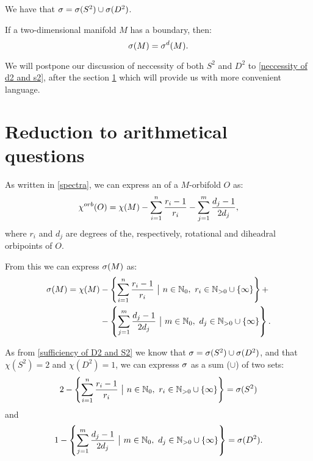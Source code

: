 
\begin{corollary}
We have that ${\sigma} = {{\sigma}(S^2)} \cup {{\sigma}(D^2)}$.
\end{corollary}

\begin{observation}\label{only dihedral} 
If a two-dimensional manifold $M$ has a boundary, then:
\begin{equation}
{{\sigma}(M)} = {\sigma}^{d}(M).
\end{equation}
\end{observation}

We will postpone our discussion of neccessity of both $S^2$ and $D^2$ to 
\ref{neccessity of d2 and s2}, after 
the 
section \ref{Reduction to arithmetical questions section} which will provide us 
with more convenient language. 

\section{Reduction to arithmetical questions}\label{Reduction to arithmetical questions section}
As written in \ref{spectra}, we can express an \Eoc of a $M$-orbifold $O$ as:
\begin{equation}
{\chi^{orb}(O)} = \chi (M) - \sum_{i=1}^n \frac{r_i-1}{r_i} - \sum_{j=1}^m \frac{d_j-1}{2d_j},
\end{equation}
where $r_i$ and $d_j$ are degrees of the, respectively, rotational and diheadral orbipoints 
of $O$.

From this we can express ${{\sigma}(M)}$ as:
\begin{align}
\spe(M) = \chi (M) &-\left\{\sum\limits_{i=1}^n \frac{r_i-1}{r_i}\ \big|\ n\in\mathbb{N}_0,\ 
r_i\in\mathbb{N}_{>0}\cup \{\infty\}\right\}+ \\
&- \left\{\sum\limits_{j=1}^m\frac{d_j-1}{2d_j}\ 
\big|\ m\in\mathbb{N}_0,\ d_j\in\mathbb{N}_{>0}\cup \{\infty\}\right\} .
\end{align}

As from \ref{sufficiency of D2 and S2} we know that ${\sigma} = {{\sigma}(S^2)} \cup {{\sigma}(D^2)}$, and that 
$\chi (S^2) = 2$ and $\chi (D^2) = 1$, we can expresss ${\sigma}$ as a sum ($\cup$) of two sets:
\begin{equation}
2 -\left\{\sum\limits_{i=1}^n \frac{r_i-1}{r_i}\ \big|\ n\in\mathbb{N}_0,\ 
r_i\in\mathbb{N}_{>0}\cup \{\infty\}\right\} = \spe(S^2)
\end{equation}
and
\begin{equation}
1 - \left\{\sum\limits_{j=1}^m\frac{d_j-1}{2d_j}\ 
\big|\ m\in\mathbb{N}_0,\ d_j\in\mathbb{N}_{>0}\cup \{\infty\}\right\} = \spe(D^2) .
\end{equation}

